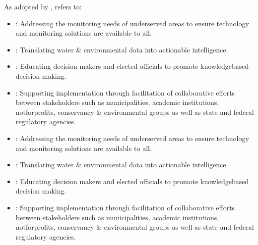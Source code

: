 \documentclass[letterpaper,12pt,english]{sphinxmanual}
\begin{document}
\sphinxAtStartPar
As adopted by ,  refers to:
\begin{itemize}
\item {} 
\sphinxAtStartPar
{}: Addressing the monitoring needs of under\sphinxhyphen{}served areas to ensure technology and monitoring solutions are available to all.

\item {} 
\sphinxAtStartPar
{}: Translating water \& environmental data into actionable intelligence.

\item {} 
\sphinxAtStartPar
{}: Educating decision makers and elected officials to promote knowledge\sphinxhyphen{}based decision making.

\item {} 
\sphinxAtStartPar
{}: Supporting implementation through facilitation of collaborative efforts between stakeholders such as municipalities, academic institutions, not\sphinxhyphen{}for\sphinxhyphen{}profits, conservancy \& environmental groups as well as state and federal regulatory agencies.

\end{itemize}
\begin{itemize}
\item {} 
\sphinxAtStartPar
{}: Addressing the monitoring needs of under\sphinxhyphen{}served areas to ensure technology and monitoring solutions are available to all.

\item {} 
\sphinxAtStartPar
{}: Translating water \& environmental data into actionable intelligence.

\item {} 
\sphinxAtStartPar
{}: Educating decision makers and elected officials to promote knowledge\sphinxhyphen{}based decision making.

\item {} 
\sphinxAtStartPar
{}: Supporting implementation through facilitation of collaborative efforts between stakeholders such as municipalities, academic institutions, not\sphinxhyphen{}for\sphinxhyphen{}profits, conservancy \& environmental groups as well as state and federal regulatory agencies.

\end{itemize}
\end{document}
